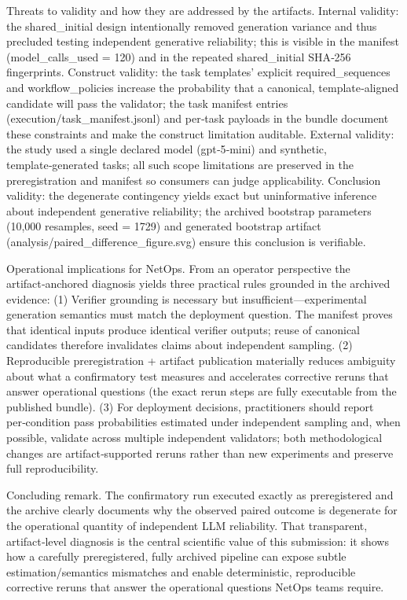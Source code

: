 \documentclass[conference]{IEEEtran}
\begin{document}
Threats to validity and how they are addressed by the artifacts. Internal validity: the shared\_initial design intentionally removed generation variance and thus precluded testing independent generative reliability; this is visible in the manifest (model\_calls\_used = 120) and in the repeated shared\_initial SHA‑256 fingerprints. Construct validity: the task templates' explicit required\_sequences and workflow\_policies increase the probability that a canonical, template‑aligned candidate will pass the validator; the task manifest entries (execution/task\_manifest.jsonl) and per‑task payloads in the bundle document these constraints and make the construct limitation auditable. External validity: the study used a single declared model (gpt‑5‑mini) and synthetic, template‑generated tasks; all such scope limitations are preserved in the preregistration and manifest so consumers can judge applicability. Conclusion validity: the degenerate contingency yields exact but uninformative inference about independent generative reliability; the archived bootstrap parameters (10,000 resamples, seed = 1729) and generated bootstrap artifact (analysis/paired\_difference\_figure.svg) ensure this conclusion is verifiable.

Operational implications for NetOps. From an operator perspective the artifact‑anchored diagnosis yields three practical rules grounded in the archived evidence: (1) Verifier grounding is necessary but insufficient---experimental generation semantics must match the deployment question. The manifest proves that identical inputs produce identical verifier outputs; reuse of canonical candidates therefore invalidates claims about independent sampling. (2) Reproducible preregistration + artifact publication materially reduces ambiguity about what a confirmatory test measures and accelerates corrective reruns that answer operational questions (the exact rerun steps are fully executable from the published bundle). (3) For deployment decisions, practitioners should report per‑condition pass probabilities estimated under independent sampling and, when possible, validate across multiple independent validators; both methodological changes are artifact‑supported reruns rather than new experiments and preserve full reproducibility.

Concluding remark. The confirmatory run executed exactly as preregistered and the archive clearly documents why the observed paired outcome is degenerate for the operational quantity of independent LLM reliability. That transparent, artifact‑level diagnosis is the central scientific value of this submission: it shows how a carefully preregistered, fully archived pipeline can expose subtle estimation/semantics mismatches and enable deterministic, reproducible corrective reruns that answer the operational questions NetOps teams require.
\end{document}
